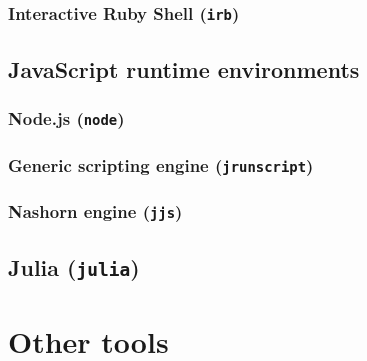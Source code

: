 

\subsubsection{Interactive Ruby Shell (\texttt{irb})}



\subsection{JavaScript runtime environments}

\subsubsection{Node.js (\texttt{node})}



\subsubsection{Generic scripting engine (\texttt{jrunscript})}



\subsubsection{Nashorn engine (\texttt{jjs})}



\subsection{Julia (\texttt{julia})}



\section{Other tools}

